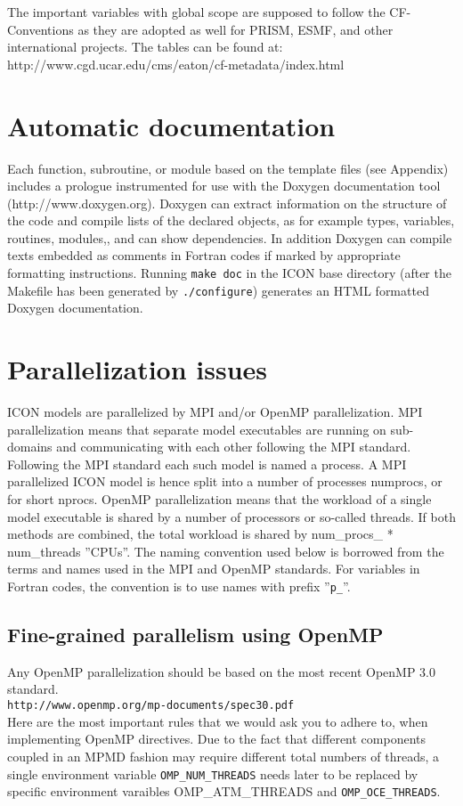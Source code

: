 \documentclass[a4paper,11pt,DIV16,BCOR1cm,titlepage]{scrartcl}
\begin{document}
The important variables with global scope are supposed to follow the   
CF-Conventions as they are adopted as well for PRISM, ESMF, and other  
international projects. The tables can be found at:  
http://www.cgd.ucar.edu/cms/eaton/cf-metadata/index.html    
     
%
\section{Automatic documentation}  
%
Each function, subroutine, or module based on the template files (see Appendix) includes a 
prologue instrumented for use with the Doxygen documentation tool (http://www.doxygen.org). 
Doxygen can extract information on the structure of the code and compile lists of the declared
objects, as for example types, variables, routines, modules,, and can show dependencies. In 
addition Doxygen can compile texts embedded as comments in Fortran codes if marked by
appropriate formatting instructions.
%
Running \texttt{make doc} in the ICON base directory (after the Makefile has been 
generated by \texttt{./configure}) generates an HTML formatted Doxygen documentation.

%
\section{Parallelization issues}
%
ICON models are parallelized by MPI and/or OpenMP parallelization. MPI parallelization 
means that separate model executables are running on sub-domains and communicating 
with each other following the MPI standard. Following the MPI standard each such model 
is named a process. A MPI parallelized ICON model is hence split into a number of processes 
numprocs, or for short nprocs.
%
OpenMP parallelization means that the workload of a single model executable is shared by a 
number of processors or so-called threads. If both methods are combined, the total workload is 
shared by num\_procs\_ * num\_threads ''CPUs''.
The naming convention used below is borrowed from the terms and names used in the MPI and 
OpenMP standards. For variables in Fortran codes, the convention is to use names with prefix 
''\texttt{p\_}''.\\
%
\subsection{Fine-grained parallelism using OpenMP}
%
Any OpenMP parallelization should be based on the most recent OpenMP 3.0 standard. \\
{\color{blue}
\texttt{http://www.openmp.org/mp-documents/spec30.pdf} }\\
Here are the most important rules that we would ask you to adhere to, when 
implementing OpenMP directives.
%
Due to the fact that different components coupled in an MPMD fashion may require different total 
numbers of threads, a single environment variable \texttt{OMP\_NUM\_THREADS} needs later to 
be replaced by specific environment varaibles OMP\_ATM\_THREADS and 
\texttt{OMP\_OCE\_THREADS}.
\end{document}
